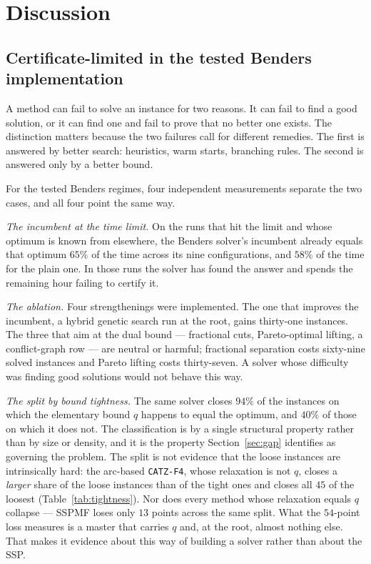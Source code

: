 \section{Discussion}\label{sec:disc}

\subsection{Certificate-limited in the tested Benders implementation}\label{ssec:disc-bound}

A method can fail to solve an instance for two reasons. It can fail to find a good
solution, or it can find one and fail to prove that no better one exists. The
distinction matters because the two failures call for different remedies. The first
is answered by better search: heuristics, warm starts, branching rules. The second is
answered only by a better bound.

For the tested Benders regimes, four independent measurements separate the two cases,
and all four point the same way.

\emph{The incumbent at the time limit.} On the runs that hit the limit and whose
optimum is known from elsewhere, the Benders solver's incumbent already equals that
optimum $65\%$ of the time across its nine configurations, and $58\%$ of the time for
the plain one. In those runs the solver has found the answer and spends the remaining
hour failing to certify it.

\emph{The ablation.} Four strengthenings were implemented. The one that improves the
incumbent, a hybrid genetic search run at the root, gains thirty-one instances. The
three that aim at the dual bound --- fractional cuts, Pareto-optimal lifting, a
conflict-graph row --- are neutral or harmful; fractional separation costs sixty-nine
solved instances and Pareto lifting costs thirty-seven. A solver whose difficulty was finding good solutions would not behave
this way.

\emph{The split by bound tightness.} The same solver closes $94\%$ of the instances on
which the elementary bound $q$ happens to equal the optimum, and $40\%$ of those on
which it does not. The classification is by a single structural property rather than by
size or density, and it is the property Section~\ref{sec:gap} identifies as governing
the problem. The split is not evidence that the loose instances are intrinsically hard:
the arc-based \texttt{CATZ-F4}, whose relaxation is not $q$, closes a \emph{larger}
share of the loose instances than of the tight ones and closes all $45$ of the loosest
(Table~\ref{tab:tightness}). Nor does every method whose relaxation equals $q$ collapse
--- SSPMF loses only $13$ points across the same split. What the $54$-point loss
measures is a master that carries $q$ and, at the root, almost nothing else. That makes
it evidence about this way of building a solver rather than about the SSP.

